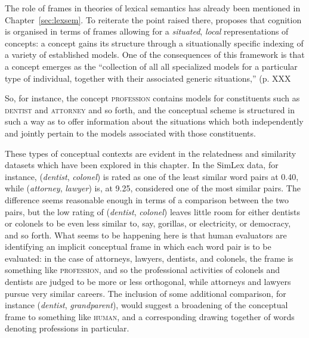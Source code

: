The role of frames in theories of lexical semantics has already been mentioned in Chapter~\ref{sec:lexsem}.  To reiterate the point raised there, \cite{BarsalouEA1993} proposes that cognition is organised in terms of frames allowing for a \emph{situated}, \emph{local} representations of concepts: a concept gains its structure through a situationally specific indexing of a variety of established models.  One of the consequences of this framework is that a concept emerges as the ``collection of all all specialized models for a particular type of individual, together with their associated generic situations,'' (p. XXX

So, for instance, the concept \textsc{profession} contains models for constituents such as \textsc{dentist} and \textsc{attorney} and so forth, and the conceptual scheme is structured in such a way as to offer information about the situations which both independently and jointly pertain to the models associated with those constituents.

These types of conceptual contexts are evident in the relatedness and similarity datasets which have been explored in this chapter.  In the SimLex data, for instance, (\emph{dentist}, \emph{colonel}) is rated as one of the least similar word pairs at 0.40, while (\emph{attorney}, \emph{lawyer}) is, at 9.25, considered one of the most similar pairs.  The difference seems reasonable enough in terms of a comparison between the two pairs, but the low rating of (\emph{dentist}, \emph{colonel}) leaves little room for either dentists or colonels to be even less similar to, say, gorillas, or electricity, or democracy, and so forth.  What seems to be happening here is that human evaluators are identifying an implicit conceptual frame in which each word pair is to be evaluated: in the case of attorneys, lawyers, dentists, and colonels, the frame is something like \textsc{profession}, and so the professional activities of colonels and dentists are judged to be more or less orthogonal, while attorneys and lawyers pursue very similar careers.  The inclusion of some additional comparison, for instance (\emph{dentist}, \emph{grandparent}), would suggest a broadening of the conceptual frame to something like \textsc{human}, and a corresponding drawing together of words denoting professions in particular.

